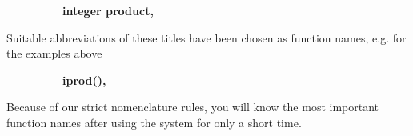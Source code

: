 \begin{tabbing}
     \ \ \ \ \ \ \ \ \ \   \=          {\bf integer product,}  \=\\
\end{tabbing} 

Suitable abbreviations of these titles have been chosen as function 
names, e.g. for the examples above

\begin{tabbing} 
\ \ \ \ \ \ \ \ \ \  \= {\bf iprod(),} \= \\    
\end{tabbing}

Because of our strict nomenclature rules, you will know the most important function
names after using the system for only a short time.

